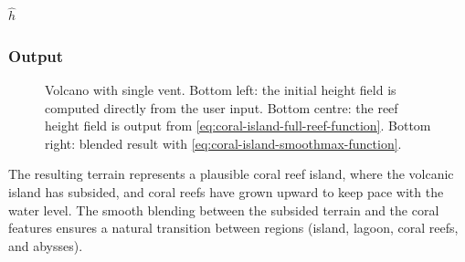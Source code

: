 \begin{algorithm}[H]
    \caption{Subsidence, coral growth, and smooth blending.}
    \label{alg:subsidence-coral-blend}
    \DontPrintSemicolon
    \BlankLine




    \Return $\hat{h}$
\end{algorithm}

\subsubsection{Output}
\label{sec:coral-island-procedural-output}

\begin{figure}
    \caption[Volcano with coral reef generated using our curve-based method]{Volcano with single vent. Bottom left: the initial height field is computed directly from the user input. Bottom centre: the reef height field is output from \cref{eq:coral-island-full-reef-function}. Bottom right: blended result with \cref{eq:coral-island-smoothmax-function}.}
    \label{fig:coral-island-volcano-example}
\end{figure}

The resulting terrain represents a plausible coral reef island, where the volcanic island has subsided, and coral reefs have grown upward to keep pace with the water level. The smooth blending between the subsided terrain and the coral features ensures a natural transition between regions (island, lagoon, coral reefs, and abysses).

